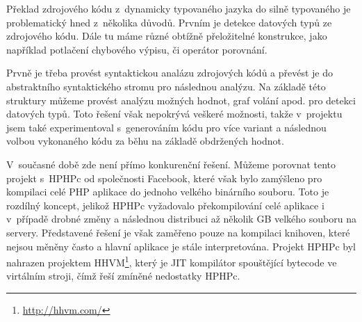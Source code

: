 \documentclass[czech]{ExcelAtFIT}
\begin{document}
		Překlad zdrojového kódu z~dynamicky typovaného jazyka do silně typovaného je problematický hned z~několika důvodů. Prvním je detekce datových typů ze zdrojového kódu. Dále tu máme různé obtížně přeložitelné konstrukce, jako například potlačení chybového výpisu, či operátor porovnání.


		Prvně je třeba provést syntaktickou analázu zdrojových kódů a převést je do abstraktního syntaktického stromu pro následnou analýzu. Na základě této struktury můžeme provést analýzu možných hodnot, graf volání apod. pro detekci datových typů. Toto řešení však nepokrývá veškeré možnosti, takže v~projektu jsem také experimentoval s~generováním kódu pro více variant a následnou volbou vykonaného kódu za běhu na základě obdržených hodnot.







		V~současné době zde není přímo konkurenční řešení. Můžeme porovnat tento projekt s~HPHPc od společnosti Facebook, které však bylo zamýšleno pro kompilaci celé PHP aplikace do jednoho velkého binárního sou\-bo\-ru. Toto je rozdílný koncept, jelikož HPHPc vy\-ža\-do\-va\-lo překompilování celé aplikace i v~případě drobné změny a následnou distribuci až několik GB velkého souboru na servery. Představené řešení je však zaměřeno pouze na kompilaci knihoven, které nejsou měněny často a hlavní aplikace je stále interpretována. Projekt HPHPc byl nahrazen projektem HHVM\footnote{\url{http://hhvm.com/}}, který je JIT kompilátor spouštějící bytecode ve virtálním stroji, čímž řeší zmíněné nedostatky HPHPc\cite{hphpcHipHop}.
\end{document}
